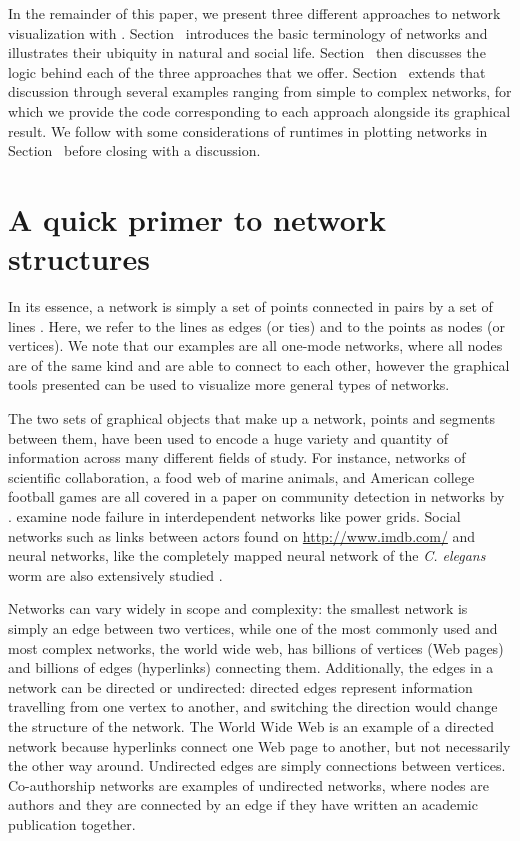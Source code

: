 In the remainder of this paper, we present three different approaches to network visualization with . Section~ introduces the basic terminology of networks and illustrates their ubiquity in natural and social life. Section~ then discusses the logic behind each of the three approaches that we offer. Section~ extends that discussion through several examples ranging from simple to complex networks, for which we provide the code corresponding to each approach alongside its graphical result. We follow with some considerations of runtimes in plotting networks in Section~ before closing with a discussion.

\section{A quick primer to network structures}
\label{sec:background}

In its essence, a network is simply a set of points connected in pairs by a set of lines \citep{newman}. Here, we refer to the lines as edges (or ties) and to the points as nodes (or vertices). We note that our examples are all one-mode networks, where all nodes are of the same kind and are able to connect to each other, however the graphical tools presented can be used to visualize more general types of networks. %

The two sets of graphical objects that make up a network, points and segments between them, have been used to encode a huge variety and quantity of information across many different fields of study. For instance, networks of scientific collaboration, a food web of marine animals, and American college football games are all covered in a paper on community detection in networks by \citet{football}. \citet{networkfailures} examine node failure in interdependent networks like power grids.  Social networks such as links between actors found on \url{http://www.imdb.com/} and neural networks, like the completely mapped neural network of the \textit{C. elegans} worm are also extensively studied \citep{smallworld}.

Networks can vary widely in scope and complexity: the smallest network is simply an edge between two vertices, while one of the most commonly used and most complex networks, the world wide web, has billions of vertices (Web pages) and billions of edges (hyperlinks) connecting them. Additionally, the edges in a network can be directed or undirected: directed edges represent information travelling from one vertex to another, and switching the direction would change the structure of the network. The World Wide Web is an example of a directed network because hyperlinks connect one Web page to another, but not necessarily the other way around. Undirected edges are simply connections between vertices. Co-authorship networks are examples of undirected networks, where nodes are authors and they are connected by an edge if they have written an academic publication together.

